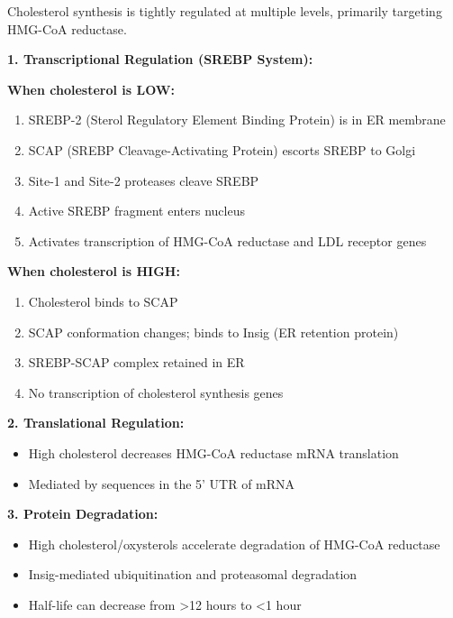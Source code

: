 Cholesterol synthesis is tightly regulated at multiple levels, primarily targeting HMG-CoA reductase.

\textbf{1. Transcriptional Regulation (SREBP System):}

\begin{tcolorbox}[colback=green!5, colframe=green!70!black, title=\textbf{SREBP-2 Pathway}]
\textbf{When cholesterol is LOW:}
\begin{enumerate}
    \item SREBP-2 (Sterol Regulatory Element Binding Protein) is in ER membrane
    \item SCAP (SREBP Cleavage-Activating Protein) escorts SREBP to Golgi
    \item Site-1 and Site-2 proteases cleave SREBP
    \item Active SREBP fragment enters nucleus
    \item Activates transcription of HMG-CoA reductase and LDL receptor genes
\end{enumerate}

\textbf{When cholesterol is HIGH:}
\begin{enumerate}
    \item Cholesterol binds to SCAP
    \item SCAP conformation changes; binds to Insig (ER retention protein)
    \item SREBP-SCAP complex retained in ER
    \item No transcription of cholesterol synthesis genes
\end{enumerate}
\end{tcolorbox}

\textbf{2. Translational Regulation:}
\begin{itemize}
    \item High cholesterol decreases HMG-CoA reductase mRNA translation
    \item Mediated by sequences in the 5' UTR of mRNA
\end{itemize}

\textbf{3. Protein Degradation:}
\begin{itemize}
    \item High cholesterol/oxysterols accelerate degradation of HMG-CoA reductase
    \item Insig-mediated ubiquitination and proteasomal degradation
    \item Half-life can decrease from >12 hours to <1 hour
\end{itemize}


